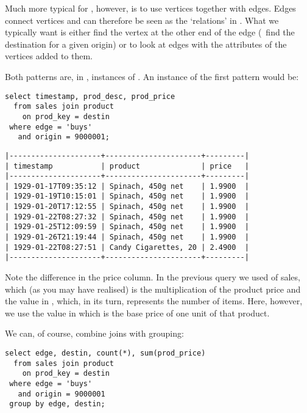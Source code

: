 Much more typical for \nowdb, however,
is to use vertices together with edges. Edges connect vertices
and can therefore be seen as the `relations' in \nowdb.
What we typically want is either find the vertex
at the other end of the edge (\eg\ find the destination
for a given origin) or to look at edges with the attributes
of the vertices added to them.

Both patterns are, in \sql, instances of .
An instance of the first pattern would be:

\begin{sqlcode}
\begin{lstlisting}
select timestamp, prod_desc, prod_price
  from sales join product
    on prod_key = destin
 where edge = 'buys'
   and origin = 9000001;
\end{lstlisting}
\end{sqlcode}

\begin{verbatim}
|---------------------+----------------------+---------|
| timestamp           | product              | price   |
|---------------------+----------------------+---------|
| 1929-01-17T09:35:12 | Spinach, 450g net    | 1.9900  |
| 1929-01-19T10:15:01 | Spinach, 450g net    | 1.9900  |
| 1929-01-20T17:12:55 | Spinach, 450g net    | 1.9900  |
| 1929-01-22T08:27:32 | Spinach, 450g net    | 1.9900  |
| 1929-01-25T12:09:59 | Spinach, 450g net    | 1.9900  |
| 1929-01-26T21:19:44 | Spinach, 450g net    | 1.9900  |
| 1929-01-22T08:27:51 | Candy Cigarettes, 20 | 2.4900  |
|---------------------+----------------------+---------|
\end{verbatim}

Note the difference in the price column.
In the previous query we used  of sales,
which (as you may have realised)
is the multiplication of the product price and the value
in , which, in its turn,
represents the number of items.
Here, however, we use the value in 
which is the base price of one unit of that product.

We can, of course, combine joins with grouping:

\begin{sqlcode}
\begin{lstlisting}
select edge, destin, count(*), sum(prod_price)
  from sales join product
    on prod_key = destin
 where edge = 'buys'
   and origin = 9000001
 group by edge, destin;
\end{lstlisting}
\end{sqlcode}

